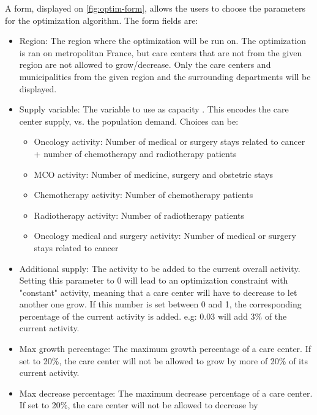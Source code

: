 A form, displayed on \cref{fig:optim-form}, allows the users to choose the
parameters for the optimization algorithm. The form fields are:

\begin{itemize}
    \item Region: The region where the optimization will be run on. The
          optimization is ran on metropolitan France, but care centers that are not
          from the given region are not allowed to grow/decrease. Only the care
          centers and municipalities from the given region and the surrounding
          departments will be displayed.
    \item Supply variable: The variable to use as capacity . This encodes the
          care center supply, vs. the population demand. Choices can be:
          \begin{itemize}
              \item Oncology activity: Number of medical or surgery stays related to
                    cancer + number of chemotherapy and radiotherapy patients
              \item MCO activity: Number of medicine, surgery and obstetric stays
              \item Chemotherapy activity: Number of chemotherapy patients
              \item Radiotherapy activity: Number of radiotherapy patients
              \item Oncology medical and surgery activity: Number of medical or
                    surgery stays related to cancer
          \end{itemize}
    \item Additional supply: The activity to be added to the current overall
          activity. Setting this parameter to 0 will lead to an optimization
          constraint with "constant" activity, meaning that a care center will have to
          decrease to let another one grow. If this number is set between 0 and 1, the
          corresponding percentage of the current activity is added. e.g: 0.03 will
          add 3\% of the current activity.
    \item Max growth percentage: The maximum growth percentage of a care center.
          If set to 20\%, the care center will not be allowed to grow by more of 20\%
          of its current activity.
    \item Max decrease percentage: The maximum decrease percentage of a care
          center. If set to 20\%, the care center will not be allowed to decrease by

\end{itemize}
